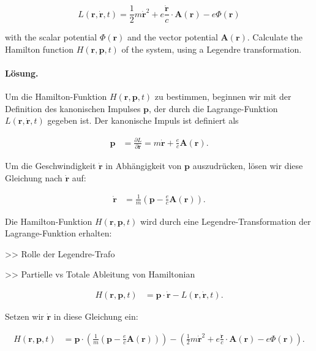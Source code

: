 \documentclass[11pt,a4paper]{article}
\begin{document}
$$
L(\mathbf{r}, \dot{\mathbf{r}}, t)=\frac{1}{2} m \dot{\mathbf{r}}^2+e \frac{\dot{\mathbf{r}}}{c} \cdot \mathbf{A}(\mathbf{r})-e \Phi(\mathbf{r})
$$

with the scalar potential $\Phi(\mathbf{r})$ and the vector potential $\mathbf{A}(\mathbf{r})$.
Calculate the Hamilton function $H(\mathbf{r}, \mathbf{p}, t)$ of the system, using a Legendre transformation.

\paragraph{Lösung.}
Um die Hamilton-Funktion \( H(\mathbf{r}, \mathbf{p}, t) \) zu bestimmen, beginnen wir mit der Definition des kanonischen Impulses \(\mathbf{p}\), der durch die Lagrange-Funktion \( L(\mathbf{r}, \dot{\mathbf{r}}, t) \) gegeben ist. Der kanonische Impuls ist definiert als

\begin{align*}
\mathbf{p} &= \frac{\partial L}{\partial \dot{\mathbf{r}}} = m \dot{\mathbf{r}} + \frac{e}{c} \mathbf{A}(\mathbf{r}).
\end{align*}

Um die Geschwindigkeit \(\dot{\mathbf{r}}\) in Abhängigkeit von \(\mathbf{p}\) auszudrücken, lösen wir diese Gleichung nach \(\dot{\mathbf{r}}\) auf:

\begin{align*}
\dot{\mathbf{r}} &= \frac{1}{m} \left( \mathbf{p} - \frac{e}{c} \mathbf{A}(\mathbf{r}) \right).
\end{align*}

Die Hamilton-Funktion \( H(\mathbf{r}, \mathbf{p}, t) \) wird durch eine Legendre-Transformation der Lagrange-Funktion erhalten:

>> Rolle der Legendre-Trafo

>> Partielle vs Totale Ableitung von Hamiltonian

\begin{align*}
H(\mathbf{r}, \mathbf{p}, t) &= \mathbf{p} \cdot \dot{\mathbf{r}} - L(\mathbf{r}, \dot{\mathbf{r}}, t).
\end{align*}

Setzen wir \(\dot{\mathbf{r}}\) in diese Gleichung ein:

\begin{align*}
H(\mathbf{r}, \mathbf{p}, t) &= \mathbf{p} \cdot \left( \frac{1}{m} \left( \mathbf{p} - \frac{e}{c} \mathbf{A}(\mathbf{r}) \right) \right) - \left( \frac{1}{2} m \dot{\mathbf{r}}^2 + e \frac{\dot{\mathbf{r}}}{c} \cdot \mathbf{A}(\mathbf{r}) - e \Phi(\mathbf{r}) \right).
\end{align*}
\end{document}
